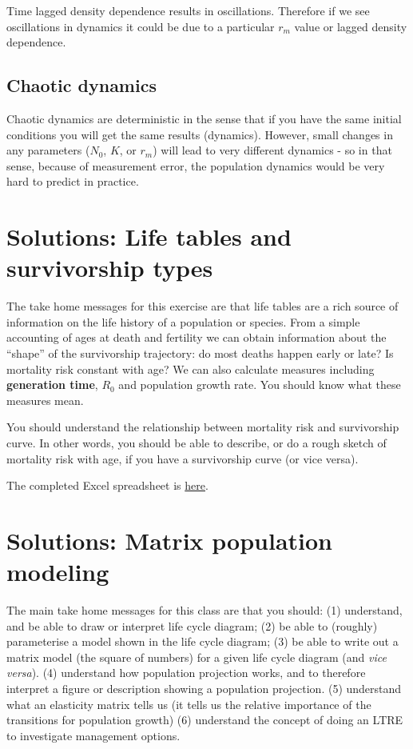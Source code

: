 \documentclass[
  a4paper]{book}
\begin{document}
Time lagged density dependence results in oscillations. Therefore if we see oscillations in dynamics it could be due to a particular \(r_m\) value or lagged density dependence.

\subsection{Chaotic dynamics}\label{chaotic-dynamics}

Chaotic dynamics are deterministic in the sense that if you have the same initial conditions you will get the same results (dynamics). However, small changes in any parameters (\(N_0\), \(K\), or \(r_m\)) will lead to very different dynamics - so in that sense, because of measurement error, the population dynamics would be very hard to predict in practice.

\section{Solutions: Life tables and survivorship types}\label{solutions-life-tables-and-survivorship-types}

The take home messages for this exercise are that life tables are a rich source of information on the life history of a population or species. From a simple accounting of ages at death and fertility we can obtain information about the ``shape'' of the survivorship trajectory: do most deaths happen early or late? Is mortality risk constant with age? We can also calculate measures including \textbf{generation time}, \(R_0\) and population growth rate. You should know what these measures mean.

You should understand the relationship between mortality risk and survivorship curve. In other words, you should be able to describe, or do a rough sketch of mortality risk with age, if you have a survivorship curve (or vice versa).

The completed Excel spreadsheet is \href{https://www.dropbox.com/s/j8uv2wf7nz0ygmp/Life\%20tables\%20exercise\%20-\%20complete.xlsx?dl=1}{here}.

\section{Solutions: Matrix population modeling}\label{solutions-matrix-population-modeling}

The main take home messages for this class are that you should:
(1) understand, and be able to draw or interpret life cycle diagram;
(2) be able to (roughly) parameterise a model shown in the life cycle diagram;
(3) be able to write out a matrix model (the square of numbers) for a given life cycle diagram (and \emph{vice versa}).
(4) understand how population projection works, and to therefore interpret a figure or description showing a population projection.
(5) understand what an elasticity matrix tells us (it tells us the relative importance of the transitions for population growth)
(6) understand the concept of doing an LTRE to investigate management options.
\end{document}
